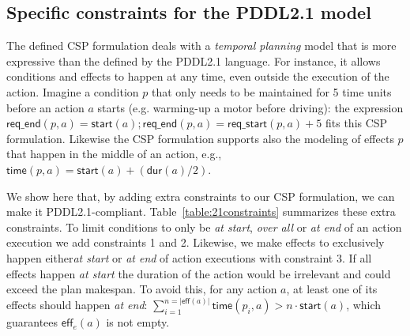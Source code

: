 \documentclass{ecai}
\newcommand{\eff}{\mathsf{eff}}    %
\newcommand{\dur}{\mathsf{dur}}    %
\newcommand{\start}{\mathsf{start}}%
\newcommand{\tim}{\mathsf{time}}   %
\newcommand{\reqs}{\mathsf{req\_{start}}} %
\newcommand{\reqe}{\mathsf{req\_{end}}}   %
\begin{document}
\subsection{Specific constraints for the PDDL2.1 model}
\label{sec:PDDL21constraints}
The defined CSP formulation deals with a {\em temporal planning} model that is more expressive than the defined by the PDDL2.1 language. For instance, it allows conditions and effects to happen at any time, even outside the execution of the action. Imagine a condition $p$ that only needs to be maintained for 5 time units before an action $a$ starts (e.g. warming-up a motor before driving): the expression $\reqe(p,a)=\start(a); \reqe(p,a) = \reqs(p,a)+5$ fits this CSP formulation. Likewise the CSP formulation supports also the modeling of effects $p$ that happen in the middle of an action, e.g., $\tim(p,a) = \start(a)+ (\dur(a) / 2)$.

We show here that, by adding extra constraints to our CSP formulation, we can make it PDDL2.1-compliant. Table~\ref{table:21constraints} summarizes these extra constraints. To limit conditions to only be \emph{at start}, \emph{over all} or \emph{at end} of an action execution we add constraints 1 and 2. Likewise, we make effects to exclusively happen either\emph{at start} or \emph{at end} of action executions with constraint 3. If all effects happen \emph{at start} the duration of the action would be irrelevant and could exceed the plan makespan. To avoid this, for any action $a$, at least one of its effects should happen \emph{at end}: $\sum_{i=1}^{n =|\eff(a)|} \tim(p_i,a) > n \cdot \start(a)$, which guarantees $\eff_e(a)$ is not empty.
\end{document}
